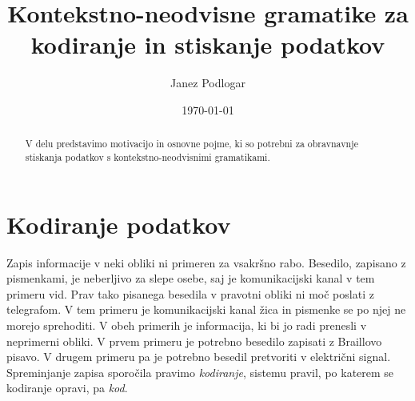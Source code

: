 \documentclass{amsart}
\title{Kontekstno-neodvisne gramatike za kodiranje in stiskanje podatkov}
\author{Janez Podlogar}
\date{\today}
\theoremstyle{definition} %
\theoremstyle{plain} %
\begin{document}
\begin{abstract}

    V delu predstavimo motivacijo in osnovne pojme, ki so potrebni za obravnavnje
    stiskanja podatkov s kontekstno-neodvisnimi gramatikami.

\end{abstract}

\maketitle

\section{Kodiranje podatkov}

Zapis informacije v neki obliki ni primeren za vsakršno rabo. Besedilo, zapisano z 
pismenkami, je neberljivo za slepe osebe, saj je komunikacijski kanal v tem primeru
vid. Prav tako pisanega besedila v pravotni obliki ni moč poslati z telegrafom. V tem
primeru je komunikacijski kanal žica in pismenke se po njej ne morejo sprehoditi. V obeh 
primerih je informacija, ki bi jo radi prenesli v neprimerni obliki. V prvem 
primeru je potrebno besedilo zapisati z Braillovo pisavo. V drugem primeru pa je 
potrebno besedil pretvoriti v električni signal. Spreminjanje zapisa sporočila
pravimo \textit{kodiranje}, sistemu pravil, po katerem se kodiranje opravi,
pa \textit{kod}. 
\end{document}

